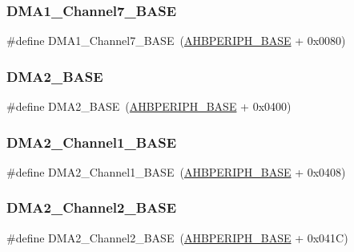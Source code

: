 \subsubsection{\texorpdfstring{DMA1\_Channel7\_BASE}{DMA1\_Channel7\_BASE}}
{\footnotesize\ttfamily \#define D\+M\+A1\+\_\+\+Channel7\+\_\+\+B\+A\+SE~(\mbox{\hyperlink{group___peripheral__memory__map_ga92eb5d49730765d2abd0f5b09548f9f5}{A\+H\+B\+P\+E\+R\+I\+P\+H\+\_\+\+B\+A\+SE}} + 0x0080)}

\mbox{\label{group___peripheral__memory__map_gab72a9ae145053ee13d1d491fb5c1df64}} 
\subsubsection{\texorpdfstring{DMA2\_BASE}{DMA2\_BASE}}
{\footnotesize\ttfamily \#define D\+M\+A2\+\_\+\+B\+A\+SE~(\mbox{\hyperlink{group___peripheral__memory__map_ga92eb5d49730765d2abd0f5b09548f9f5}{A\+H\+B\+P\+E\+R\+I\+P\+H\+\_\+\+B\+A\+SE}} + 0x0400)}

\mbox{\label{group___peripheral__memory__map_gad3bd6c4201d12f5d474518c1b02f8e3b}} 
\subsubsection{\texorpdfstring{DMA2\_Channel1\_BASE}{DMA2\_Channel1\_BASE}}
{\footnotesize\ttfamily \#define D\+M\+A2\+\_\+\+Channel1\+\_\+\+B\+A\+SE~(\mbox{\hyperlink{group___peripheral__memory__map_ga92eb5d49730765d2abd0f5b09548f9f5}{A\+H\+B\+P\+E\+R\+I\+P\+H\+\_\+\+B\+A\+SE}} + 0x0408)}

\mbox{\label{group___peripheral__memory__map_ga22f39f23c879c699b88e04a629f69d1c}} 
\subsubsection{\texorpdfstring{DMA2\_Channel2\_BASE}{DMA2\_Channel2\_BASE}}
{\footnotesize\ttfamily \#define D\+M\+A2\+\_\+\+Channel2\+\_\+\+B\+A\+SE~(\mbox{\hyperlink{group___peripheral__memory__map_ga92eb5d49730765d2abd0f5b09548f9f5}{A\+H\+B\+P\+E\+R\+I\+P\+H\+\_\+\+B\+A\+SE}} + 0x041\+C)}

